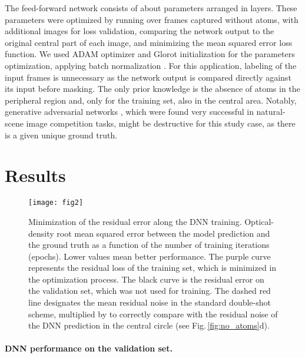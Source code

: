 \documentclass[twocolumn,groupedaddress,longbibliography]{revtex4-1}
\begin{document}
The feed-forward network consists of about  parameters arranged in  layers. These parameters were optimized by running over  frames captured without atoms, with additional  images for loss validation, comparing the network output to the original central part of each image, and minimizing the mean squared error loss function. 
We used ADAM optimizer \cite{Kingma2014} and Glorot initialization \cite{glorot2010understanding} for the parameters optimization, applying  batch normalization \cite{Ioffe2015}.
For this application, labeling of the input frames is unnecessary as the network output is compared directly against its input before masking. The only prior knowledge is the absence of atoms in the peripheral region and, only for the training set, also in the central area.
Notably, generative adversarial networks \cite{Goodfellow2014}, which were found very successful in natural-scene image competition tasks, might be destructive for this study case, as there is a given unique ground truth.


\section{Results}

\begin{figure}
\centering
\texttt{[image: fig2]}
\caption{Minimization of the residual error along the DNN training. Optical-density root mean squared error between the model prediction and the ground truth as a function of the number of training iterations (epochs). Lower values mean better performance. The purple curve represents the residual loss of the training set, which is minimized in the optimization process. The black curve is the residual error on the validation set, which was not used for training. The dashed red line designates the mean residual noise in the standard double-shot scheme, multiplied by  to correctly compare with the residual noise of the DNN prediction in the central circle (see Fig.\,\ref{fig:no_atoms}d).
}
\label{fig:loss}
\end{figure}

\paragraph*{DNN performance on the validation set.}
\end{document}
